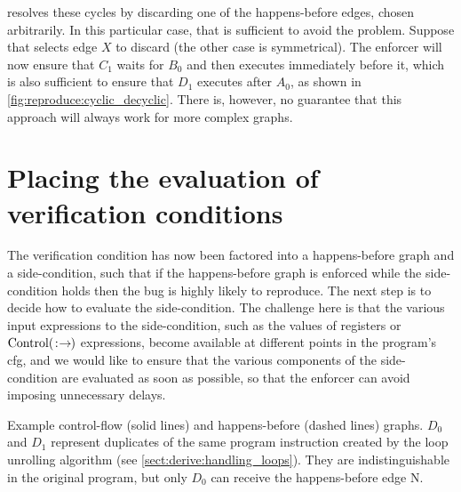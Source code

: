 {\Technique} resolves these cycles by discarding one of the
happens-before edges, chosen arbitrarily.  In this particular case,
that is sufficient to avoid the problem.  Suppose that {\technique}
selects edge $X$ to discard (the other case is symmetrical).  The
enforcer will now ensure that $C_1$ waits for $B_0$ and then executes
immediately before it, which is also sufficient to ensure that $D_1$
executes after $A_0$, as shown in
\autoref{fig:reproduce:cyclic_decyclic}.  There is, however, no
guarantee that this approach will always work for more complex graphs.

\section{Placing the evaluation of verification conditions}
\label{sect:enforce:place_vcs}

The verification condition has now been factored into a happens-before
graph and a side-condition, such that if the happens-before graph is
enforced while the side-condition holds then the bug is highly likely
to reproduce.  The next step is to decide how to evaluate the
side-condition.  The challenge here is that the various input
expressions to the side-condition, such as the values of registers or
${\mathrm{Control}}(\mathrm{}\!:\!\mathrm{\!}\!\rightarrow\!\mathrm{\!})$ expressions, become available at different
points in the program's \gls{cfg}, and we would like to ensure that
the various components of the side-condition are evaluated as soon as
possible, so that the enforcer can avoid imposing unnecessary delays.

\begin{sanefig}
  \vspace{-8pt}
  \vspace{-4pt}
  \caption{Example control-flow (solid lines) and happens-before
    (dashed lines) graphs.  $D_0$ and $D_1$ represent duplicates of
    the same program instruction created by the loop unrolling
    algorithm (see \autoref{sect:derive:handling_loops}).  They are
    indistinguishable in the original program, but only $D_0$ can
    receive the happens-before edge N.}
  \label{fig:place_conditions_example}
  \vspace{4pt}
\end{sanefig}

